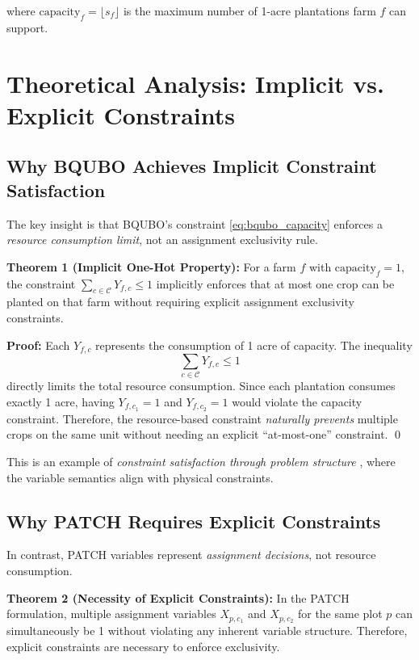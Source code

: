 \documentclass[11pt,a4paper]{article}
\begin{document}
where $\text{capacity}_f = \lfloor s_f \rfloor$ is the maximum number of 1-acre plantations farm $f$ can support.

\section{Theoretical Analysis: Implicit vs. Explicit Constraints}

\subsection{Why BQUBO Achieves Implicit Constraint Satisfaction}

The key insight is that BQUBO's constraint \eqref{eq:bqubo_capacity} enforces a \emph{resource consumption limit}, not an assignment exclusivity rule.

\textbf{Theorem 1 (Implicit One-Hot Property):} 
For a farm $f$ with $\text{capacity}_f = 1$, the constraint $\sum_{c \in \mathcal{C}} Y_{f,c} \leq 1$ implicitly enforces that at most one crop can be planted on that farm without requiring explicit assignment exclusivity constraints.

\textbf{Proof:}
Each $Y_{f,c}$ represents the consumption of 1 acre of capacity. The inequality
\begin{equation}
\sum_{c \in \mathcal{C}} Y_{f,c} \leq 1
\end{equation}
directly limits the total resource consumption. Since each plantation consumes exactly 1 acre, having $Y_{f,c_1} = 1$ and $Y_{f,c_2} = 1$ would violate the capacity constraint. Therefore, the resource-based constraint \emph{naturally prevents} multiple crops on the same unit without needing an explicit ``at-most-one'' constraint. \qed

This is an example of \emph{constraint satisfaction through problem structure} \cite{sharma2025cutting}, where the variable semantics align with physical constraints.

\subsection{Why PATCH Requires Explicit Constraints}

In contrast, PATCH variables represent \emph{assignment decisions}, not resource consumption.

\textbf{Theorem 2 (Necessity of Explicit Constraints):}
In the PATCH formulation, multiple assignment variables $X_{p,c_1}$ and $X_{p,c_2}$ for the same plot $p$ can simultaneously be 1 without violating any inherent variable structure. Therefore, explicit constraints are necessary to enforce exclusivity.
\end{document}
